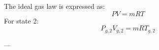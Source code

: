 The ideal gas law is expressed as:  
\[
PV = mRT
\]  
For state 2:  
\[
P_{g,2}V_{g,2} = mRT_{g,2}
\]  

---
